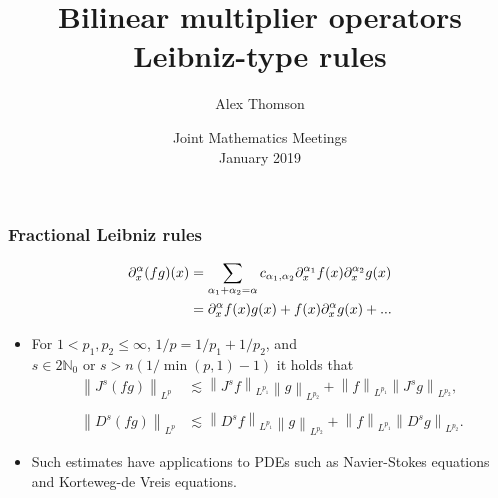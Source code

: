 \documentclass[xcolor=dvipsnames]{beamer}
\title[Leibniz-type rules]{Bilinear multiplier operators Leibniz-type rules}
\author[Alex Thomson]{Alex Thomson}
\institute[Kansas State University]{
Department of Mathematics \\
Kansas State University
 }
\date[January 2019]{Joint Mathematics Meetings\\ January 2019}
\newcommand{\na}{\mathbb{N}}
\newcommand{\fr}[2]{{\textstyle \frac{#1}{#2}}}
\newcommand{\norm}[2]{{\left\| #1 \right\|}_{#2}}
\newcommand{\hcline}{1/p=1/p_1+1/p_2}
\begin{document}
\begin{frame}[plain]
  \titlepage
\end{frame}


\begin{frame}\frametitle{Fractional Leibniz rules}
\begin{align*}
\partial^\alpha_x(fg)(x) & = \sum_{\alpha_1 + \alpha_2 = \alpha} c_{\alpha_1,\alpha_2} \partial^{\alpha_1}_x f(x) \partial^{\alpha_2}_x g(x)\\ \medskip
& =\partial^\alpha_x f(x) g(x) + f(x) \partial^\alpha_x g(x) + ...
\end{align*}

\begin{itemize}
\item For $1<p_1,p_2\le \infty$, $\hcline$, and $s\in 2\na_0 \text{ or } s>n({1}/{\min(p,1)}-1)$ it holds that \begin{align*}
 \norm{J^s(fg)}{L^p} &\lesssim  \norm{J^sf}{L^{p_1}} \norm{g}{L^{p_2}}+ \norm{f}{L^{p_1}} \norm{J^sg}{L^{p_2}},\\
 &\\
   \norm{D^s(fg)}{L^p} &\lesssim  \norm{D^sf}{L^{p_1}} \norm{g}{L^{p_2}}+ \norm{f}{L^{p_1}} \norm{D^sg}{L^{p_2}}.
\end{align*}

\item Such estimates have applications to PDEs such as Navier-Stokes equations and Korteweg-de Vreis equations.
\end{itemize}

\end{frame}



%
\end{document}
